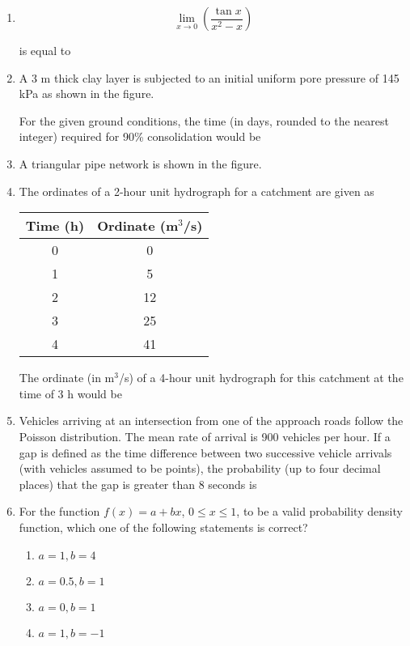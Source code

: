 \documentclass[article]{IEEEtran}
\numberwithin{figure}{enumi}
\begin{document}
\begin{enumerate}
\item 
\begin{equation}
   \lim_{x \to 0} \left( \frac{\tan x}{x^2 - x} \right)
\end{equation}

is equal to \underline{\hspace{2cm}}

\item A 3 m thick clay layer is subjected to an initial uniform pore pressure of 145 kPa as shown in the figure.

For the given ground conditions, the time (in days, rounded to the nearest integer) required for 90\% consolidation would be \underline{\hspace{2cm}}

\item A triangular pipe network is shown in the figure.



\item The ordinates of a 2-hour unit hydrograph for a catchment are given as

\begin{center}
\begin{tabular}{|c|c|}
\hline
Time (h) & Ordinate (m\(^3\)/s) \\
\hline
0 & 0 \\
1 & 5 \\
2 & 12 \\
3 & 25 \\
4 & 41 \\
\hline
\end{tabular}
\end{center}

The ordinate (in m\(^3\)/s) of a 4-hour unit hydrograph for this catchment at the time of 3 h would be \underline{\hspace{2cm}}



\item Vehicles arriving at an intersection from one of the approach roads follow the Poisson distribution. The mean rate of arrival is 900 vehicles per hour. If a gap is defined as the time difference between two successive vehicle arrivals (with vehicles assumed to be points), the probability (up to four decimal places) that the gap is greater than 8 seconds is \underline{\hspace{2cm}}

\item For the function \( f(x) = a + bx \), \( 0 \leq x \leq 1 \), to be a valid probability density function, which one of the following statements is correct?
    \begin{enumerate}
        \item \( a = 1, b = 4 \)
        \item \( a = 0.5, b = 1 \)
        \item \( a = 0, b = 1 \)
        \item \( a = 1, b = -1 \)
    \end{enumerate}
\end{enumerate}
\end{document}
